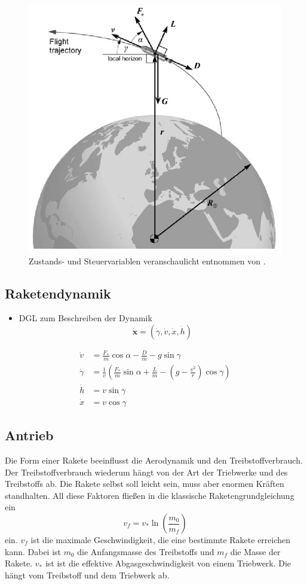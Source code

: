 \begin{figure}
	\centering
	\includegraphics[width=0.5\linewidth]{papers/leo/Grafiken/forces.png}
	\caption{Zustands- und Steuervariablen veranschaulicht entnommen von \cite{leo:astronautics}.}
	\label{fig:leo:forces}
\end{figure}


\subsection{Raketendynamik}
\begin{itemize}
	\item DGL zum Beschreiben der Dynamik \[\mathbf{\dot{x}} = (\dot{\gamma},\dot{v},\dot{x},\dot{h})\]
\end{itemize}
\begin{align*}
	\dot{v} &= \frac{F_*}{m} \cos \alpha - \frac{D}{m} - g \sin \gamma \\
	\dot{\gamma} &= \frac{1}{v}\left( \frac{F_*}{m} \sin \alpha + \frac{L}{m} - \left(g - \frac{v^2}{r}\right) \cos \gamma \right)\\
	\dot{h} &= v \sin \gamma \\
	\dot{x} &= v \cos \gamma        
\end{align*}


\subsection{Antrieb}
Die Form einer Rakete beeinflusst die Aerodynamik und den Treibstoffverbrauch. 
Der Treibstoffverbrauch wiederum hängt von der Art der Triebwerke und des Treibstoffs ab.
Die Rakete selbst soll leicht sein, muss aber enormen Kräften standhalten.
All diese Faktoren fließen in die klassische Raketengrundgleichung ein
\begin{equation}
	v_f = v_* \ln \left(\frac{m_0}{m_f}\right)
	\label{leo:raketengleichung}
\end{equation}
ein.
$v_f$ ist die maximale Geschwindigkeit, die eine bestimmte Rakete erreichen kann.
Dabei ist $m_0$ die Anfangsmasse des Treibstoffs und $m_f$ die Masse der Rakete. 
$v_*$ ist ist die effektive Abgasgeschwindigkeit von einem Triebwerk.
Die hängt vom Treibstoff und dem Triebwerk ab.


